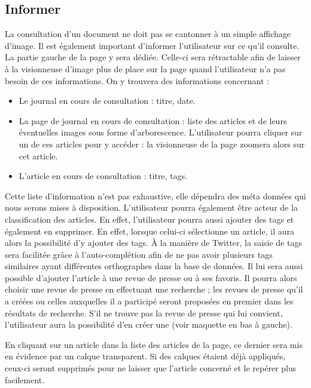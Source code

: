 \subsection{Informer}
\label{sec:consultation_informer}
	La consultation d’un document ne doit pas se cantonner à un simple affichage d’image. Il est également important d’informer l’utilisateur sur ce qu’il consulte. La partie gauche de la page y sera dédiée. Celle-ci sera rétractable afin de laisser à la visionneuse d'image plus de place sur la page quand l'utilisateur n'a pas besoin de ces informations.
On y trouvera des informations concernant :
\begin{itemize}
\item Le journal en cours de consultation : titre, date.
\item La page de journal en cours de consultation : liste des articles et de leurs éventuelles images sous forme d'arborescence. L'utilisateur pourra cliquer sur un de ces articles pour y accéder : la visionneuse de la page zoomera alors sur cet article.
\item L’article en cours de consultation : titre, tags.
\end{itemize}
\bigskip
\par
	Cette liste d’information n’est pas exhaustive, elle dépendra des méta données qui nous serons mises à disposition.
	L’utilisateur pourra également être acteur de la classification des articles. En effet, l'utilisateur pourra aussi ajouter des tags et également en supprimer. En effet, lorsque celui-ci sélectionne un article, il aura alors la possibilité d'y ajouter des tags. À la manière de Twitter, la saisie de tags sera facilitée grâce à l'auto-complétion afin de ne pas avoir plusieurs tags similaires ayant différentes orthographes dans la base de données. Il lui sera aussi possible d’ajouter l’article à une revue de presse ou à ses favoris. Il pourra alors choisir une revue de presse en effectuant une recherche ; les revues de presse qu’il a créées ou celles auxquelles il a participé seront proposées en premier dans les résultats de recherche. S’il ne trouve pas la revue de presse qui lui convient, l’utilisateur aura la possibilité d’en créer une (voir maquette en bas à gauche). 

	En cliquant sur un article dans la liste des articles de la page, ce dernier sera mis en évidence par un calque transparent. Si des calques étaient déjà appliqués, ceux-ci seront supprimés pour ne laisser que l'article concerné et le repérer plus facilement.


